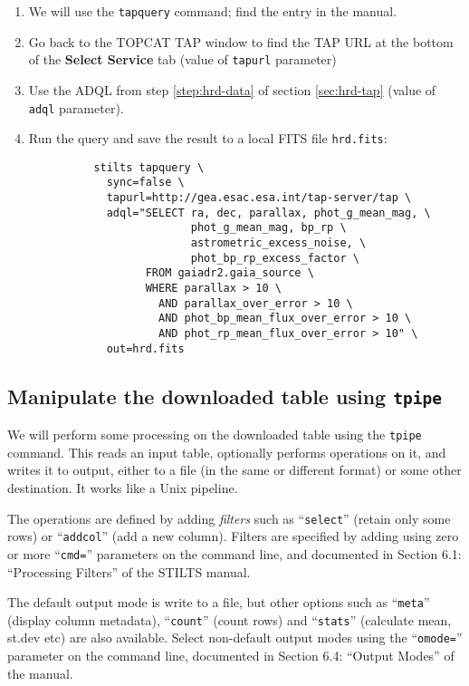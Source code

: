 \documentclass{article}
\newcommand{\lab}[1]{{\bf #1}}
\begin{document}
\begin{enumerate}
\item We will use the {\tt tapquery} command;
      find the entry in the manual.
\item Go back to the TOPCAT TAP window to find the TAP URL at the
      bottom of the \lab{Select Service} tab (value of {\tt tapurl} parameter)
\item Use the ADQL from step \ref{step:hrd-data} of section \ref{sec:hrd-tap}
      (value of {\tt adql} parameter).
\item Run the query and save the result to a local FITS file {\tt hrd.fits}:
      \begin{verbatim}
          stilts tapquery \
            sync=false \
            tapurl=http://gea.esac.esa.int/tap-server/tap \
            adql="SELECT ra, dec, parallax, phot_g_mean_mag, \
                         phot_g_mean_mag, bp_rp \
                         astrometric_excess_noise, \
                         phot_bp_rp_excess_factor \
                  FROM gaiadr2.gaia_source \
                  WHERE parallax > 10 \
                    AND parallax_over_error > 10 \
                    AND phot_bp_mean_flux_over_error > 10 \
                    AND phot_rp_mean_flux_over_error > 10" \
            out=hrd.fits
      \end{verbatim}
\end{enumerate}

\subsection{Manipulate the downloaded table using {\tt tpipe}}

We will perform some processing on the downloaded table using
the {\tt tpipe} command.
This reads an input table, optionally performs operations on it,
and writes it to output, either to a file (in the same or different format)
or some other destination.  It works like a Unix pipeline.

The operations are defined by adding {\em filters} such as
``{\tt select}'' (retain only some rows) or ``{\tt addcol}''
(add a new column).  Filters are specified by adding using zero
or more ``{\tt cmd=}'' parameters on the command line,
and documented in Section 6.1: ``Processing Filters'' of the STILTS manual.

The default output mode is write to a file,
but other options such as ``{\tt meta}'' (display column metadata),
``{\tt count}'' (count rows) and ``{\tt stats}'' (calculate mean, st.dev etc)
are also available.
Select non-default output modes using the ``{\tt omode=}'' parameter
on the command line, documented in Section 6.4: ``Output Modes'' of the manual.
\end{document}
